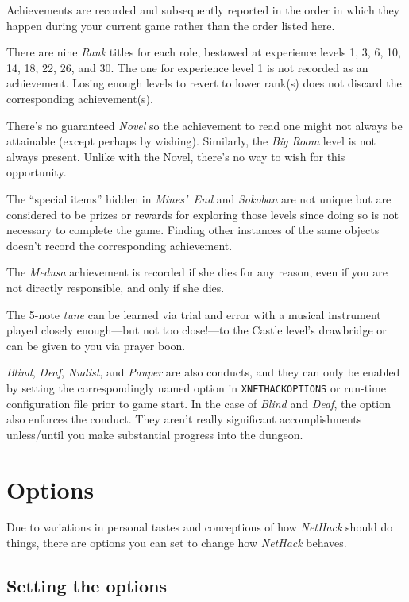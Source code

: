 \documentclass[titlepage]{article}
\begin{document}
Achievements are recorded and subsequently reported in the order in which
they happen during your current game rather than the order listed here.

There are nine \textit{Rank} titles for each role, bestowed at experience
levels 1, 3, 6, 10, 14, 18, 22, 26, and 30.
The one for experience level 1 is not recorded as an achievement.
Losing enough levels to revert to lower rank(s) does not discard the
corresponding achievement(s).

There's no guaranteed \textit{Novel} so the achievement to read one might
not always be attainable (except perhaps by wishing).
Similarly, the \textit{Big Room} level is not always present.
Unlike with the Novel, there's no way to wish for this opportunity.

The ``special items'' hidden in \textit{Mines'~End} and \textit{Sokoban}
are not unique but are considered to be prizes or rewards
for exploring those levels since doing so is not necessary to complete
the game.
Finding other instances of the same objects doesn't record the
corresponding achievement.

The \textit{Medusa} achievement is recorded if she dies for any reason,
even if you are not directly responsible, and only if she dies.

The 5-note \textit{tune} can be learned via trial and error with a musical
instrument played closely
enough---but not too close!---to
the Castle level's drawbridge or can be given to you via prayer boon.

\textit{Blind}, \textit{Deaf}, \textit{Nudist}, and \textit{Pauper} are also conducts, and they can only be
enabled by setting the correspondingly named option in \texttt{XNETHACKOPTIONS}
or run-time configuration file prior to game start.
In the case of \textit{Blind} and \textit{Deaf}, the option also enforces the
conduct.
They aren't really significant accomplishments unless/until you make
substantial progress into the dungeon.

\section{Options}

Due to variations in personal tastes and conceptions of how \textit{NetHack}
should do things, there are options you can set to change how \textit{NetHack}
behaves.

\subsection*{Setting the options}
\end{document}
